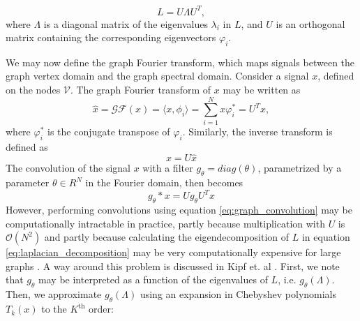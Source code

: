 \begin{equation}
    L = U \Lambda U^T,
    \label{eq:laplacian_decomposition}
\end{equation}
where $\Lambda$ is a diagonal matrix of the eigenvalues $\lambda_i$ in $L$, and $U$ is an orthogonal matrix containing the corresponding eigenvectors $\varphi_i$. 

We may now define the graph Fourier transform, which maps signals between the graph vertex domain and the graph spectral domain. Consider a signal $x$, defined on the nodes $\mathcal{V}$. The graph Fourier transform of $x$ may be written as
\begin{equation}
    \hat{x} = \mathcal{GF}(x) = \langle x, \phi_i \rangle = \sum_{i=1}^N x \varphi_i^* = U^T x,
    \label{eq:graph_fourier_transform}
\end{equation}
where $\varphi_i^*$ is the conjugate transpose of $\varphi_i$. Similarly, the inverse transform is defined as 
\begin{equation}
    x = U\hat{x}
    \label{eq:inverse_graph_fourier_transform}
\end{equation}
The convolution of the signal $x$ with a filter $g_\theta = diag(\theta)$, parametrized by a parameter $\theta \in R^N$ in the Fourier domain, then becomes 
\begin{equation}
    g_\theta * x = U g_\theta U^T x
    \label{eq:graph_convolution}
\end{equation}
However, performing convolutions using equation \ref{eq:graph_convolution} may be computationally intractable in practice, partly because multiplication with $U$ is $\mathcal{O}(N^2)$ and partly because calculating the eigendecomposition of $L$ in equation \eqref{eq:laplacian_decomposition} may be very computationally expensive for large graphs \cite{kipf_semi_supervised}. A way around this problem is discussed in Kipf et. al \cite{kipf_semi_supervised}. First, we note that $g_\theta$ may be interpreted as a function of the eigenvalues of $L$, i.e. $g_\theta(\Lambda)$. Then, we approximate $g_\theta(\Lambda)$ using an expansion in Chebyshev polynomials $T_k(x)$ to the $K^{\text{th}}$ order:

